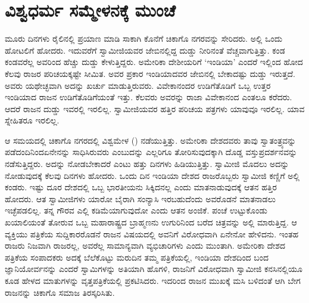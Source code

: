 
\chapter{ವಿಶ್ವಧರ್ಮ ಸಮ್ಮೇಳನಕ್ಕೆ ಮುಂಚೆ}

 ಮೂರು ದಿನಗಳು ರೈಲಿನಲ್ಲಿ ಪ್ರಯಾಣ ಮಾಡಿ ಸಾಕಾಗಿ ಕೊನೆಗೆ ಚಿಕಾಗೊ ನಗರವನ್ನು ಸೇರಿದರು. ಅಲ್ಲಿ ಒಂದು ಹೋಟಲಿಗೆ ಹೋದರು. ಇದುವರೆಗೆ ಸ್ವಾಮೀಜಿಯವರ ಜೇಬಿನಲ್ಲಿದ್ದ ದುಡ್ಡು ನೀರಿನಂತೆ ವೆಚ್ಚವಾಗುತ್ತಿತ್ತು. ಕಂಡ ಕಂಡವರೆಲ್ಲ ಅವರಿಂದ ಹೆಚ್ಚು ದುಡ್ಡು ಕೇಳುತ್ತಿದ್ದರು. ಅಮೇರಿಕಾ ದೇಶೀಯರಿಗೆ ‘ಇಂಡಿಯಾ’ ಎಂದರೆ ಇಲ್ಲಿಂದ ಹೋದ ಕೆಲವು ರಾಜರ ಪರಿಚಯಕ್ಕಷ್ಟೇ ಸೀಮಿತ. ಅವರ ಪ್ರಕಾರ ಇಂಡಿಯಾದವರ ಜೇಬಿನಲ್ಲಿ ಬೇಕಾದಷ್ಟು ದುಡ್ಡು ಇರುತ್ತದೆ. ಅವರು ಯಥೇಚ್ಛವಾಗಿ ಅದನ್ನು ಖರ್ಚು ಮಾಡುತ್ತಿರುವರು. ವಿವೇಕಾನಂದರ ಉಡಿಗೆತೊಡಿಗೆ ಒಬ್ಬ ಉತ್ತರ ಇಂಡಿಯಾದ ರಾಜನ ಉಡಿಗೆತೊಡಿಗೆಯಂತೆ ಇತ್ತು. ಕೆಲವರು ಅವರನ್ನು ರಾಜಾ ವಿವೇಕಾನಂದ ಎಂತಲೂ ಕರೆದರು. ಆದರೆ ರಾಜನ ದುಡ್ಡು ಇವರಲ್ಲಿ ಇರಲಿಲ್ಲ. ಸ್ವಾಮೀಜಿಯವರ ಹತ್ತಿರ ಪರಿಚಯ ಪತ್ರಗಳು ಯಾವುವೂ ಇರಲಿಲ್ಲ. ಯಾವ ಸ್ನೇಹಿತರೂ ಇರಲಿಲ್ಲ. 

 ಆ ಸಮಯದಲ್ಲಿ ಚಿಕಾಗೊ ನಗರದಲ್ಲಿ ವಿಶ್ವಮೇಳ () ನಡೆಯುತ್ತಿತ್ತು. ಅಮೇರಿಕಾ ದೇಶದವರು ತಾವು ಸ್ವಾತಂತ್ರ್ಯವನ್ನು ಪಡೆದಂದಿನಿಂದ\break ಏನೇನನ್ನು ಸಾಧಿಸಿರುವರು ಎಂಬುದನ್ನು ಎಲ್ಲರಿಗೂ ತೋರಿಸುವುದಕ್ಕಾಗಿ ದೊಡ್ಡ ವಸ್ತುಪ್ರದರ್ಶನವನ್ನು ನಡೆಸುತ್ತಿದ್ದರು. ಅದನ್ನು ನೋಡಬೇಕಾದರೆ ಎಂಟು ಹತ್ತು ದಿನಗಳು ಹಿಡಿಯುತ್ತಿತ್ತು. ಸ್ವಾಮೀಜಿ ಮೊದಲು ಅದನ್ನು ನೋಡುವುದಕ್ಕೆ ಕೆಲವು ದಿನಗಳು ಹೋದರು. ಒಂದು ದಿನ ಇಂಡಿಯಾ ದೇಶದ ರಾಜರೊಬ್ಬರು ಸ್ವಾಮೀಜಿ ಕಣ್ಣಿಗೆ ಅಲ್ಲಿ ಕಂಡರು. ಇಷ್ಟು ದೂರ ದೇಶದಲ್ಲಿ ಒಬ್ಬ ಭಾರತೀಯನು ಸಿಕ್ಕಿದನಲ್ಲ ಎಂದು ಮಾತನಾಡುವುದಕ್ಕೆ ಆತನ ಹತ್ತಿರ ಹೋದರು. ಆತ ಸ್ವಾಮೀಜಿಗಳು ಯಾರೋ ಬೈರಾಗಿ ಸಂನ್ಯಾಸಿ ಇರಬಹುದೆಂದು ಅವರೊಡನೆ ಮಾತನಾಡಲು ಇಚ್ಛೆಪಡಲಿಲ್ಲ. ತನ್ನ ಗೌರವ ಎಲ್ಲಿ ಕಡಿಮೆಯಾಗುವುದೋ ಎಂದು ಆತನ ಅಂಜಿಕೆ. ಪಂಚೆ ಉಟ್ಟುಕೊಂಡು ಖಯಾಲಿಯಂತೆ ತೋರುವ ಒಬ್ಬ ಮಹಾರಾಷ್ಟ್ರದ ಬ್ರಾಹ್ಮಣನು ಉಗುರಿನಿಂದ ಬರೆದ ಚಿತ್ರವನ್ನು ಅಲ್ಲಿ ಮಾರುತ್ತಿದ್ದ. ಆ ವ್ಯಕ್ತಿಯು ಪತ್ರಿಕೆಯ ಸುದ್ದಿಕಾರರೊಡನೆ ರಾಜನ ವಿಷಯದಲ್ಲಿ ಅವನಿಗೆ ವಿರೋಧವಾಗಿ ಏನೇನೋ ಹೇಳಿದನು. ಇಂತಹ ರಾಜರು ನಿಜವಾಗಿ ರಾಜರಲ್ಲ, ಅವರೆಲ್ಲ ಸಾಮಾನ್ಯವಾಗಿ ವ್ಯಭಿಚಾರಿಗಳು ಎಂದು ಮುಂತಾಗಿ. ಅಮೇರಿಕಾ ದೇಶದ ಪತ್ರಿಕೆಯ ಸಂಪಾದಕರು ಅದಕ್ಕೆ ಬೆಲೆಕೊಟ್ಟು ಮರುದಿನ ತಮ್ಮ ಪತ್ರಿಕೆಯಲ್ಲಿ, ಇಂಡಿಯಾ ದೇಶದಿಂದ ಬಂದ ಜ್ಞಾನಿಯೋರ್ವನನ್ನು ಎಂದರೆ ಸ್ವಾಮಿಗಳನ್ನು ಅತಿಯಾಗಿ ಹೊಗಳಿ, ರಾಜನಿಗೆ ವಿರೋಧವಾಗಿ ಸ್ವಾಮೀಜಿ ಕನಸಿನಲ್ಲಿಯೂ ಕೂಡ ಹೇಳದ ಮಾತುಗಳನ್ನು ವೃತ್ತಪತ್ರಿಕೆಯಲ್ಲಿ ಪ್ರಕಟಿಸಿದರು. ಇದರಿಂದ ರಾಜನ ಮುಖಕ್ಕೆ ಮಸಿ ಬಳಿದಂತೆ ಆಗಿ ಬೇಗ ರಾಜನನ್ನು ಚಿಕಾಗೊ ಸಮಾಜ ತಿರಸ್ಕರಿಸಿತು. 

